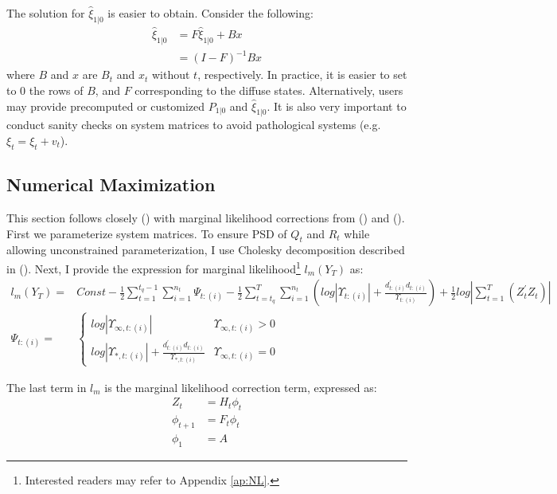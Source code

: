 \documentclass[10pt, titlepage]{article}
\numberwithin{equation}{section}
\begin{document}
The solution for $\hat{\xi}_{1|0}$ is easier to obtain. Consider the following:
\begin{align*}
    \hat{\xi}_{1|0} &= F\hat{\xi}_{1|0} + Bx \\
    &= (I - F)^{-1}Bx
\end{align*}
where $B$ and $x$ are $B_t$ and $x_t$ without $t$, respectively. In practice, it is easier to set to $0$ the rows of $B$, and $F$ corresponding to the diffuse states. Alternatively, users may provide precomputed or customized $P_{1|0}$ and $\hat{\xi}_{1|0}$. It is also very important to conduct sanity checks on system matrices to avoid pathological systems (e.g. $\xi_{t} = \xi_t + v_t$).

\subsection{Numerical Maximization} \label{subsec:NM}
This section follows closely (\cite{durbin_koopman_2001}) with marginal likelihood corrections from (\cite{francke2010likelihood}) and (\cite{harville1974bayesian}). First we parameterize system matrices. To ensure PSD of $Q_t$ and $R_t$ while allowing unconstrained parameterization, I use Cholesky decomposition described in (\cite{pinheiro1996unconstrained}). Next, I provide the expression for marginal likelihood\footnote{Interested readers may refer to Appendix \ref{ap:NL}.} $l_m(Y_T)$ as:
\begin{align}
    l_m(Y_T) =& Const - \frac{1}{2}\sum_{t=1}^{t_q-1}\sum_{i=1}^{n_t}\Psi_{t:(i)} - \frac{1}{2}\sum_{t=t_q}^{T}\sum_{i=1}^{n_t}\left(log|\Upsilon_{t:(i)}| + \frac{d_{t:(i)}^{'}d_{t:(i)}}{\Upsilon_{t:(i)}}\right) + \frac{1}{2}log\left| \sum_{t=1}^{T}(Z_t^{'}Z_t) \right| \label{eq:NM_likelihood} \\
    \Psi_{t:(i)} =& \begin{cases}
        log|\Upsilon_{\infty,t:(i)}| & \Upsilon_{\infty,t:(i)} > 0 \\
        log|\Upsilon_{*,t:(i)}| + \frac{d_{t:(i)}^{'}d_{t:(i)}}{\Upsilon_{*,t:(i)}} & \Upsilon_{\infty,t:(i)}=0
    \end{cases} \nonumber 
\end{align}

The last term in $l_m$ is the marginal likelihood correction term, expressed as:
\begin{align}    
    Z_t &= H_t\phi_t \label{eq:marginal_correct} \\
    \phi_{t+1} &= F_t\phi_t \nonumber \\
    \phi_1 &= A \nonumber
\end{align}
\end{document}
